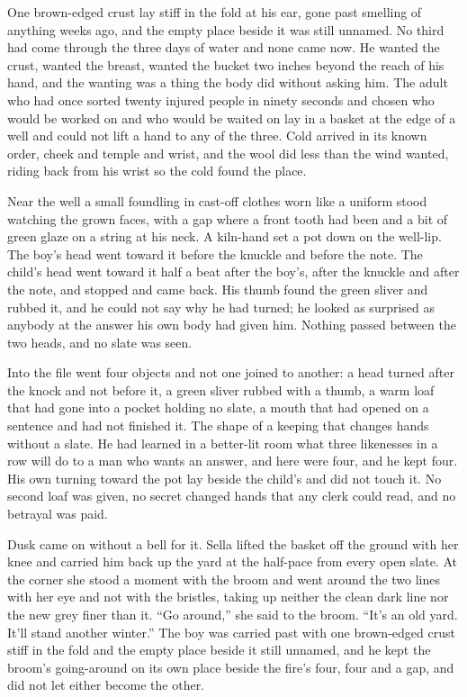One brown-edged crust lay stiff in the fold at his ear, gone past smelling of anything weeks ago, and the empty place beside it was still unnamed. No third had come through the three days of water and none came now. He wanted the crust, wanted the breast, wanted the bucket two inches beyond the reach of his hand, and the wanting was a thing the body did without asking him. The adult who had once sorted twenty injured people in ninety seconds and chosen who would be worked on and who would be waited on lay in a basket at the edge of a well and could not lift a hand to any of the three. Cold arrived in its known order, cheek and temple and wrist, and the wool did less than the wind wanted, riding back from his wrist so the cold found the place.

Near the well a small foundling in cast-off clothes worn like a uniform stood watching the grown faces, with a gap where a front tooth had been and a bit of green glaze on a string at his neck. A kiln-hand set a pot down on the well-lip. The boy’s head went toward it before the knuckle and before the note. The child’s head went toward it half a beat after the boy’s, after the knuckle and after the note, and stopped and came back. His thumb found the green sliver and rubbed it, and he could not say why he had turned; he looked as surprised as anybody at the answer his own body had given him. Nothing passed between the two heads, and no slate was seen.

Into the file went four objects and not one joined to another: a head turned after the knock and not before it, a green sliver rubbed with a thumb, a warm loaf that had gone into a pocket holding no slate, a mouth that had opened on a sentence and had not finished it. The shape of a keeping that changes hands without a slate. He had learned in a better-lit room what three likenesses in a row will do to a man who wants an answer, and here were four, and he kept four. His own turning toward the pot lay beside the child’s and did not touch it. No second loaf was given, no secret changed hands that any clerk could read, and no betrayal was paid.

Dusk came on without a bell for it. Sella lifted the basket off the ground with her knee and carried him back up the yard at the half-pace from every open slate. At the corner she stood a moment with the broom and went around the two lines with her eye and not with the bristles, taking up neither the clean dark line nor the new grey finer than it. “Go around,” she said to the broom. “It’s an old yard. It’ll stand another winter.” The boy was carried past with one brown-edged crust stiff in the fold and the empty place beside it still unnamed, and he kept the broom’s going-around on its own place beside the fire’s four, four and a gap, and did not let either become the other.

